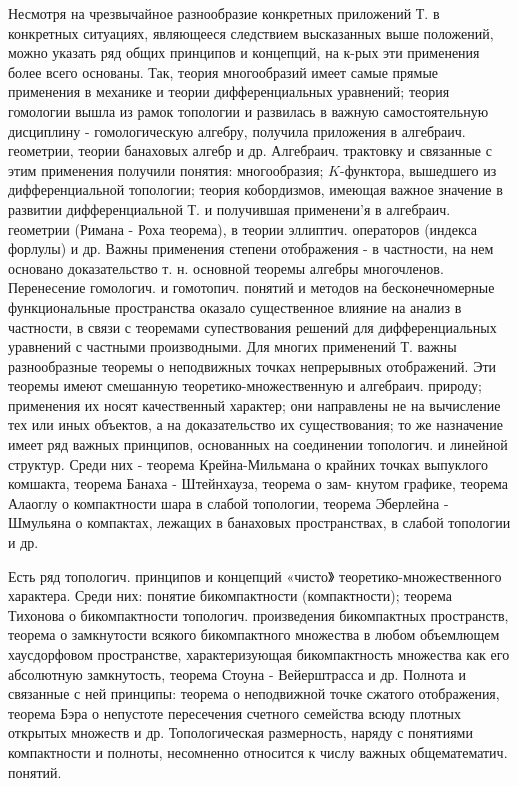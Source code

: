 \documentclass[10pt]{article}
\begin{document}
Несмотря на чрезвычайное разнообразие конкретных приложений Т. в конкретных ситуациях, являющееся следствием высказанных выше положений, можно указать ряд общих принципов и концепций, на к-рых эти применения более всего основаны. Так, теория многообразий имеет самые прямые применения в механике и теории дифференциальных уравнений; теория гомологии вышла из рамок топологии и развилась в важную самостоятельную дисциплину - гомологическую алгебру, получила приложения в алгебраич. геометрии, теории банаховых алгебр и др. Алгебраич. трактовку и связанные с этим применения получили понятия: многообразия; $K$-функтора, вышедшего из дифференциальной топологии; теория кобордизмов, имеющая важное значение в развитии дифференциальной Т. и получившая применени'я в алгебраич. геометрии (Римана - Роха теорема), в теории эллиптич. операторов (индекса форлулы) и др. Важны применения степени отображения - в частности, на нем основано доказательство т. н. основной теоремы алгебры многочленов. Перенесение гомологич. и гомотопич. понятий и методов на бесконечномерные функциональные пространства оказало существенное влияние на анализ в частности, в связи с теоремами супествования решений для дифференциальных уравнений с частными производными. Для многих применений Т. важны разнообразные теоремы о неподвижных точках непрерывных отображений. Эти теоремы имеют смешанную теоретико-множественную и алгебраич. природу; применения их носят качественный характер; они направлены не на вычисление тех или иных объектов, а на доказательство их существования; то же назначение имеет ряд важных принципов, основанных на соединении топологич. и линейной структур. Среди них - теорема Крейна-Мильмана о крайних точках выпуклого комшакта, теорема Банаха - Штейнхауза, теорема о зам- кнутом графике, теорема Алаоглу о компактности шара в слабой топологии, теорема Эберлейна - Шмульяна о компактах, лежащих в банаховых пространствах, в слабой топологии и др.



Есть ряд топологич. принципов и концепций «чисто》 теоретико-множественного характера. Среди них: понятие бикомпактности (компактности); теорема Тихонова о бикомпактности топологич. произведения бикомпактных пространств, теорема о замкнутости всякого бикомпактного множества в любом объемлющем хаусдорфовом пространстве, характеризующая бикомпактность множества как его абсолютную замкнутость, теорема Стоуна - Вейерштрасса и др. Полнота и связанные с ней принципы: теорема о неподвижной точке сжатого отображения, теорема Бэра о непустоте пересечения счетного семейства всюду плотных открытых множеств и др. Топологическая размерность, наряду с понятиями компактности и полноты, несомненно относится к числу важных общематематич. понятий.
\end{document}
